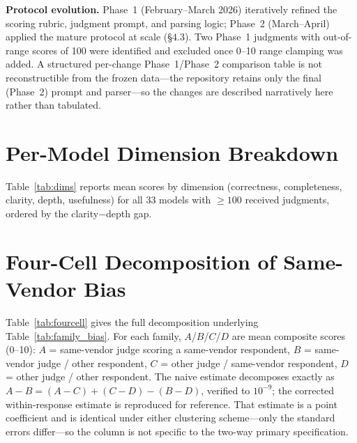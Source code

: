 \documentclass{article}
\begin{document}


\textbf{Protocol evolution.} Phase~1 (February--March 2026) iteratively refined the scoring rubric, judgment prompt, and parsing logic; Phase~2 (March--April) applied the mature protocol at scale (\S4.3). Two Phase~1 judgments with out-of-range scores of 100 were identified and excluded once 0--10 range clamping was added. A structured per-change Phase~1/Phase~2 comparison table is not reconstructible from the frozen data---the repository retains only the final (Phase~2) prompt and parser---so the changes are described narratively here rather than tabulated.

\section{Per-Model Dimension Breakdown}

Table~\ref{tab:dims} reports mean scores by dimension (correctness, completeness, clarity, depth, usefulness) for all 33 models with $\geq 100$ received judgments, ordered by the clarity$-$depth gap.



\section{Four-Cell Decomposition of Same-Vendor Bias}
\label{app:fourcell}

Table~\ref{tab:fourcell} gives the full decomposition underlying Table~\ref{tab:family_bias}. For each family, $A$/$B$/$C$/$D$ are mean composite scores (0--10): $A$ = same-vendor judge scoring a same-vendor respondent, $B$ = same-vendor judge / other respondent, $C$ = other judge / same-vendor respondent, $D$ = other judge / other respondent. The naive estimate decomposes exactly as $A-B = (A-C) + (C-D) - (B-D)$, verified to $10^{-9}$; the corrected within-response estimate is reproduced for reference. That estimate is a point coefficient and is identical under either clustering scheme---only the standard errors differ---so the column is not specific to the two-way primary specification.
\end{document}
